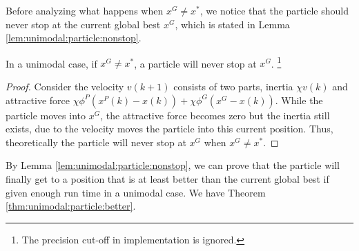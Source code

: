 Before analyzing what happens when $ x^{G} \neq x^{*}  $, we notice that the particle should never stop at the current global best $ x^{G} $, which is stated in Lemma \ref{lem:unimodal:particle:nonstop}.
\begin{mylem}
\label{lem:unimodal:particle:nonstop}
In a unimodal case, if $ x^{G} \neq x^{*} $, a particle will never stop at $ x^{G} $. 
\footnote{The precision cut-off in implementation is ignored.}
\begin{proof}
Consider the velocity $ v(k+1) $ consists of two parts, inertia $ \chi v(k) $ and attractive force $ \chi \phi^{P} (x^{P}(k) - x(k) ) + \chi \phi^{G} ( x^{G} - x(k) ) $.
While the particle moves into $ x^{G} $, the attractive force becomes zero but the inertia still exists, due to the velocity moves the particle into this current position.
Thus, theoretically the particle will never stop at $ x^{G} $ when $ x^{G} \neq x^{*} $.
\end{proof} 
\end{mylem}


By Lemma \ref{lem:unimodal:particle:nonstop}, we can prove that the particle will finally get to a position that is at least better than the current global best if given enough run time in a unimodal case.
We have Theorem \ref{thm:unimodal:particle:better}.

